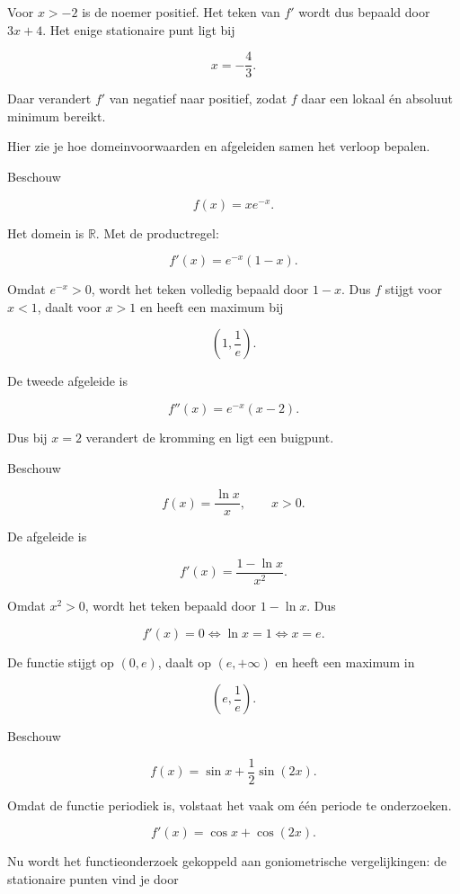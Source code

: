 \documentclass{ximera}
\begin{document}
Voor \(x>-2\) is de noemer positief. Het teken van \(f'\) wordt dus
bepaald door \(3x+4\). Het enige stationaire punt ligt bij

\[x=-\frac43.\]

Daar verandert \(f'\) van negatief naar positief, zodat \(f\) daar een
lokaal én absoluut minimum bereikt.

Hier zie je hoe domeinvoorwaarden en afgeleiden samen het verloop bepalen.


Beschouw

\[f(x)=x e^{-x}.\]

Het domein is \(\mathbb{R}\). Met de productregel:

\[
f'(x)=e^{-x}(1-x).
\]

Omdat \(e^{-x}>0\), wordt het teken volledig bepaald door \(1-x\).
Dus \(f\) stijgt voor \(x<1\), daalt voor \(x>1\) en heeft een maximum
bij

\[
\boxed{\left(1,\frac1e\right)}.
\]

De tweede afgeleide is

\[
f''(x)=e^{-x}(x-2).
\]

Dus bij \(x=2\) verandert de kromming en ligt een buigpunt.


Beschouw

\[f(x)=\frac{\ln x}{x},\qquad x>0.\]

De afgeleide is

\[
f'(x)=\frac{1-\ln x}{x^2}.
\]

Omdat \(x^2>0\), wordt het teken bepaald door \(1-\ln x\). Dus

\[
f'(x)=0
\Longleftrightarrow
\ln x=1
\Longleftrightarrow
x=e.
\]

De functie stijgt op \((0,e)\), daalt op \((e,+\infty)\) en heeft een
maximum in

\[
\boxed{\left(e,\frac1e\right)}.
\]


Beschouw

\[f(x)=\sin x+\frac12\sin(2x).\]

Omdat de functie periodiek is, volstaat het vaak om één periode te
onderzoeken.

\[
f'(x)=\cos x+\cos(2x).
\]

Nu wordt het functieonderzoek gekoppeld aan goniometrische vergelijkingen:
de stationaire punten vind je door
\end{document}
